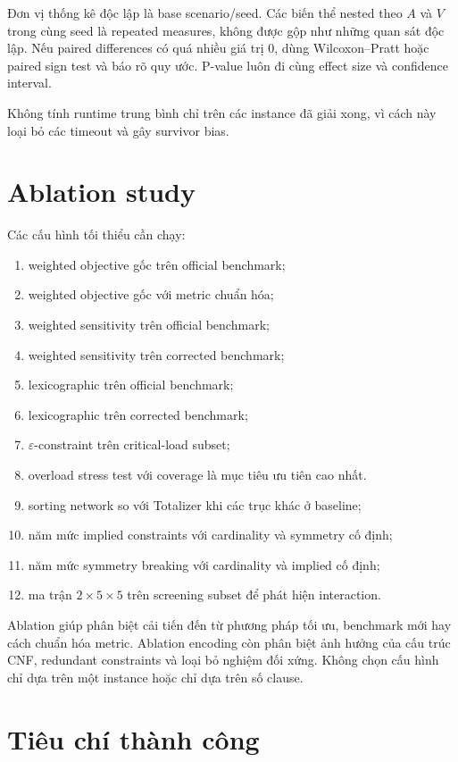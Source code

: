 \documentclass[12pt,a4paper]{article}
\begin{document}
Đơn vị thống kê độc lập là base scenario/seed. Các biến thể nested theo $A$ và
$V$ trong cùng seed là repeated measures, không được gộp như những quan sát độc
lập. Nếu paired differences có quá nhiều giá trị 0, dùng Wilcoxon--Pratt hoặc
paired sign test và báo rõ quy ước. P-value luôn đi cùng effect size và
confidence interval.

Không tính runtime trung bình chỉ trên các instance đã giải xong, vì cách này
loại bỏ các timeout và gây survivor bias.

\section{Ablation study}

Các cấu hình tối thiểu cần chạy:
\begin{enumerate}
  \item weighted objective gốc trên official benchmark;
  \item weighted objective gốc với metric chuẩn hóa;
  \item weighted sensitivity trên official benchmark;
  \item weighted sensitivity trên corrected benchmark;
  \item lexicographic trên official benchmark;
  \item lexicographic trên corrected benchmark;
  \item $\varepsilon$-constraint trên critical-load subset;
  \item overload stress test với coverage là mục tiêu ưu tiên cao nhất.
  \item sorting network so với Totalizer khi các trục khác ở baseline;
  \item năm mức implied constraints với cardinality và symmetry cố định;
  \item năm mức symmetry breaking với cardinality và implied cố định;
  \item ma trận $2\times5\times5$ trên screening subset để phát hiện interaction.
\end{enumerate}

Ablation giúp phân biệt cải tiến đến từ phương pháp tối ưu, benchmark mới hay
cách chuẩn hóa metric. Ablation encoding còn phân biệt ảnh hưởng của cấu trúc
CNF, redundant constraints và loại bỏ nghiệm đối xứng. Không chọn cấu hình chỉ
dựa trên một instance hoặc chỉ dựa trên số clause.

\section{Tiêu chí thành công}
\end{document}
